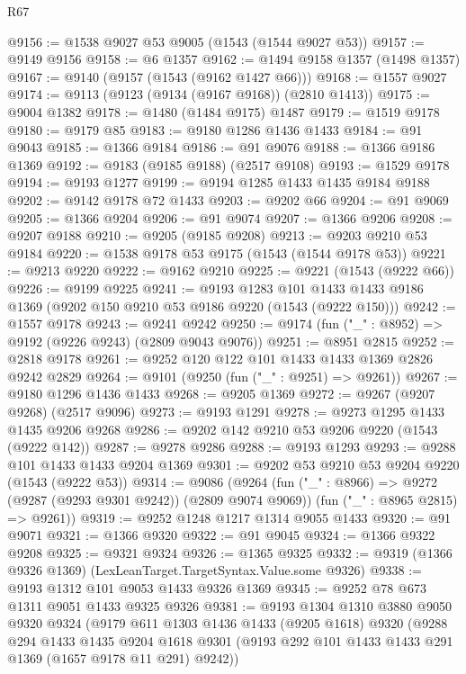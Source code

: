 \begin{lexlean}{R67}
\begin{coremodule}
@9156 := @1538 @9027 @53 @9005 (@1543 (@1544 @9027 @53))
@9157 := @9149 @9156
@9158 := @6 @1357
@9162 := @1494 @9158 @1357 (@1498 @1357)
@9167 := @9140 (@9157 (@1543 (@9162 @1427 @66)))
@9168 := @1557 @9027
@9174 := @9113 (@9123 (@9134 (@9167 @9168)) (@2810 @1413))
@9175 := @9004 @1382
@9178 := @1480 (@1484 @9175) @1487
@9179 := @1519 @9178
@9180 := @9179 @85
@9183 := @9180 @1286 @1436 @1433
@9184 := @91 @9043
@9185 := @1366 @9184
@9186 := @91 @9076
@9188 := @1366 @9186 @1369
@9192 := @9183 (@9185 @9188) (@2517 @9108)
@9193 := @1529 @9178
@9194 := @9193 @1277
@9199 := @9194 @1285 @1433 @1435 @9184 @9188
@9202 := @9142 @9178 @72 @1433
@9203 := @9202 @66
@9204 := @91 @9069
@9205 := @1366 @9204
@9206 := @91 @9074
@9207 := @1366 @9206
@9208 := @9207 @9188
@9210 := @9205 (@9185 @9208)
@9213 := @9203 @9210 @53 @9184
@9220 := @1538 @9178 @53 @9175 (@1543 (@1544 @9178 @53))
@9221 := @9213 @9220
@9222 := @9162 @9210
@9225 := @9221 (@1543 (@9222 @66))
@9226 := @9199 @9225
@9241 := @9193
    @1283
    @101
    @1433
    @1433
    @9186
    @1369
    (@9202 @150 @9210 @53 @9186 @9220 (@1543 (@9222 @150)))
@9242 := @1557 @9178
@9243 := @9241 @9242
@9250 := @9174 (fun ("_" : @8952) => @9192 (@9226 @9243) (@2809 @9043 @9076))
@9251 := @8951 @2815
@9252 := @2818 @9178
@9261 := @9252 @120 @122 @101 @1433 @1433 @1369 @2826 @9242 @2829
@9264 := @9101 (@9250 (fun ("_" : @9251) => @9261))
@9267 := @9180 @1296 @1436 @1433
@9268 := @9205 @1369
@9272 := @9267 (@9207 @9268) (@2517 @9096)
@9273 := @9193 @1291
@9278 := @9273 @1295 @1433 @1435 @9206 @9268
@9286 := @9202 @142 @9210 @53 @9206 @9220 (@1543 (@9222 @142))
@9287 := @9278 @9286
@9288 := @9193 @1293
@9293 := @9288 @101 @1433 @1433 @9204 @1369
@9301 := @9202 @53 @9210 @53 @9204 @9220 (@1543 (@9222 @53))
@9314 := @9086
    (@9264
      (fun ("_" : @8966) => @9272 (@9287 (@9293 @9301 @9242)) (@2809 @9074 @9069))
      (fun ("_" : @8965 @2815) => @9261))
@9319 := @9252 @1248 @1217 @1314 @9055 @1433
@9320 := @91 @9071
@9321 := @1366 @9320
@9322 := @91 @9045
@9324 := @1366 @9322 @9208
@9325 := @9321 @9324
@9326 := @1365 @9325
@9332 := @9319 (@1366 @9326 @1369) (LexLeanTarget.TargetSyntax.Value.some @9326)
@9338 := @9193 @1312 @101 @9053 @1433 @9326 @1369
@9345 := @9252 @78 @673 @1311 @9051 @1433 @9325 @9326
@9381 := @9193
    @1304
    @1310
    @3880
    @9050
    @9320
    @9324
    (@9179
      @611
      @1303
      @1436
      @1433
      (@9205 @1618)
      @9320
      (@9288
        @294
        @1433
        @1435
        @9204
        @1618
        @9301
        (@9193 @292 @101 @1433 @1433 @291 @1369 (@1657 @9178 @11 @291) @9242))

\end{coremodule}
\end{lexlean}
